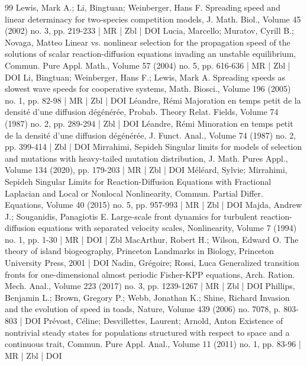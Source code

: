 \begin{thebibliography}{99}
Lewis, Mark A.; Li, Bingtuan; Weinberger, Hans F. Spreading speed and linear determinacy for two-species competition models, J. Math. Biol., Volume 45 (2002) no. 3, pp. 219-233 | MR | Zbl | DOI
Lucia, Marcello; Muratov, Cyrill B.; Novaga, Matteo Linear vs. nonlinear selection for the propagation speed of the solutions of scalar reaction-diffusion equations invading an unstable equilibrium, Commun. Pure Appl. Math., Volume 57 (2004) no. 5, pp. 616-636 | MR | Zbl | DOI
Li, Bingtuan; Weinberger, Hans F.; Lewis, Mark A. Spreading speeds as slowest wave speeds for cooperative systems, Math. Biosci., Volume 196 (2005) no. 1, pp. 82-98 | MR | Zbl | DOI
Léandre, Rémi Majoration en temps petit de la densité d’une diffusion dégénérée, Probab. Theory Relat. Fields, Volume 74 (1987) no. 2, pp. 289-294 | Zbl | DOI
Léandre, Rémi Minoration en temps petit de la densité d’une diffusion dégénérée, J. Funct. Anal., Volume 74 (1987) no. 2, pp. 399-414 | Zbl | DOI
Mirrahimi, Sepideh Singular limits for models of selection and mutations with heavy-tailed mutation distribution, J. Math. Pures Appl., Volume 134 (2020), pp. 179-203 | MR | Zbl | DOI
Méléard, Sylvie; Mirrahimi, Sepideh Singular Limits for Reaction-Diffusion Equations with Fractional Laplacian and Local or Nonlocal Nonlinearity, Commun. Partial Differ. Equations, Volume 40 (2015) no. 5, pp. 957-993 | MR | Zbl | DOI
Majda, Andrew J.; Souganidis, Panagiotis E. Large-scale front dynamics for turbulent reaction-diffusion equations with separated velocity scales, Nonlinearity, Volume 7 (1994) no. 1, pp. 1-30 | MR | DOI | Zbl
MacArthur, Robert H.; Wilson, Edward O. The theory of island biogeography, Princeton Landmarks in Biology, Princeton University Press, 2001 | DOI
Nadin, Grégoire; Rossi, Luca Generalized transition fronts for one-dimensional almost periodic Fisher-KPP equations, Arch. Ration. Mech. Anal., Volume 223 (2017) no. 3, pp. 1239-1267 | MR | Zbl | DOI
Phillips, Benjamin L.; Brown, Gregory P.; Webb, Jonathan K.; Shine, Richard Invasion and the evolution of speed in toads, Nature, Volume 439 (2006) no. 7078, p. 803-803 | DOI
Prévost, Céline; Desvillettes, Laurent; Arnold, Anton Existence of nontrivial steady states for populations structured with respect to space and a continuous trait, Commun. Pure Appl. Anal., Volume 11 (2011) no. 1, pp. 83-96 | MR | Zbl | DOI

\end{thebibliography}

